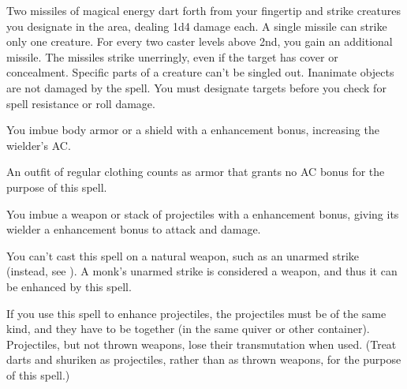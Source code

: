 \spellrng{\rngclose}
\begin{spelleffect}
  Two missiles of magical energy dart forth from your fingertip and strike creatures you designate in the area, dealing 1d4 damage each. A single missile can strike only one creature. For every two caster levels above 2nd, you gain an additional missile.
  The missiles strike unerringly, even if the target has cover or concealment. Specific parts of a creature can't be singled out. Inanimate objects are not damaged by the spell. You must designate targets before you check for spell resistance or roll damage.
\end{spelleffect}

\spellrng{\rngclose}
\spelldur{\durmed}
\begin{spelleffect}
  You imbue body armor or a shield with a  enhancement bonus, increasing the wielder's AC. \bonusscalingdescription
\end{spelleffect}
\begin{spellnotes}
  An outfit of regular clothing counts as armor that grants no AC bonus for the purpose of this spell.
\end{spellnotes}

\spellrng{\rngclose}
\spelldur{\durshort}
\begin{spelleffect}
  You imbue a weapon or stack of projectiles with a  enhancement bonus, giving its wielder a  enhancement bonus to attack and damage. \bonusscalingdescription
\end{spelleffect}
\begin{spellnotes}
  You can't cast this spell on a natural weapon, such as an unarmed strike (instead, see ). A monk's unarmed strike is considered a weapon, and thus it can be enhanced by this spell.
  \par If you use this spell to enhance projectiles, the projectiles must be of the same kind, and they have to be together (in the same quiver or other container). Projectiles, but not thrown weapons, lose their transmutation when used. (Treat darts and shuriken as projectiles, rather than as thrown weapons, for the purpose of this spell.)
\end{spellnotes}

